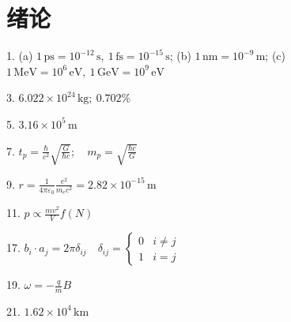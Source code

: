 
\chapter{绪论}

\begin{oddanswers}
1. (a) $1\,\mathrm{ps} = 10^{-12}\,\mathrm{s},\ 1\,\mathrm{fs} = 10^{-15}\,\mathrm{s}$;
(b) $1\,\mathrm{nm} = 10^{-9}\,\mathrm{m}$;
(c) $1\,\mathrm{MeV} = 10^6\,\mathrm{eV},\ 1\,\mathrm{GeV} = 10^9\,\mathrm{eV}$

3. $6.022 \times 10^{24}\,\mathrm{kg};\ 0.702\%$

5. $3.16 \times 10^5\,\mathrm{m}$

7. $t_p = \frac{\hbar}{c^2}\sqrt{\frac{G}{\hbar c}}; \quad m_p = \sqrt{\frac{\hbar c}{G}}$

9. $r = \frac{1}{4\pi\varepsilon_0}\frac{e^2}{m_e c^2} = 2.82 \times 10^{-15}\,\mathrm{m}$

11. $p \propto \frac{mv^2}{V}f(N)$

17. $b_i \cdot a_j = 2\pi\delta_{ij} \quad \delta_{ij} = \begin{cases} 0 & i \neq j \\ 1 & i = j \end{cases}$

19. $\omega = -\frac{q}{m}B$

21. $1.62 \times 10^4\,\mathrm{km}$
\end{oddanswers}

